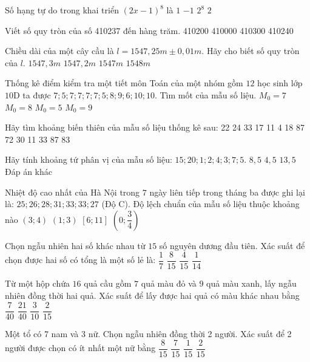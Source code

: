 \begin{ex}
Số hạng tự do trong khai triển ${{(2x-1)}^8}$ là
\choice
{$1$}
{$-1$}
{$2^8$}
{$2$}
\end{ex}
\begin{ex}
Viết số quy tròn của số 410237 đến hàng trăm.
\choice
{410200}
{410000}
{410300}
{410240}
\end{ex}
\begin{ex}
Chiều dài của một cây cầu là $l=1547{,}25m\pm 0{,}01m$. Hãy cho biết số quy tròn của $l$.
\choice
{$1547{,}3m$}
{$1547{,}2m$}
{$1547m$}
{$1548m$}
\end{ex}
\begin{ex}
Thống kê điểm kiểm tra một tiết môn Toán của một nhóm gồm $12$ học sinh lớp $10\text{D}$ ta được $7;5;7;7;7;7;5;8;9;6;10;10$. Tìm mốt của mẫu số liệu.
\choice
{$M_0=7$}
{$M_0=8$}
{$M_0=5$}
{$M_0=9$}
\end{ex}
\begin{ex}
Hãy tìm khoảng biến thiên của mẫu số liệu thống kê sau: 22 24 33 17 11 4 18 87 72 30
\choice
{11}
{33}
{87}
{83}
\end{ex}
\begin{ex}
Hãy tính khoảng tứ phân vị của mẫu số liệu: $15;20;1;2;4;3;7;5$.
\choice
{$8{,}5$}
{$4{,}5$}
{$13{,}5$}
{Đáp án khác}
\end{ex}
\begin{ex}
Nhiệt độ cao nhất của Hà Nội trong $7$ ngày liên tiếp trong tháng ba được ghi lại là: $25;26;28;31;33;33;27$ (Độ C). Độ lệch chuẩn của mẫu số liệu thuộc khoảng nào
\choice
{$\left(3;4\right)$}
{$\left(1;3\right)$}
{$\left[6;11\right]$}
{$\left(0;\dfrac{3}{4}\right)$}
\end{ex}
\begin{ex}
Chọn ngẫu nhiên hai số khác nhau từ $15$ số nguyên dương đầu tiên. Xác suất để chọn được hai số có tổng là một số lẻ là:
\choice
{$\dfrac{1}{7}$}
{$\dfrac{8}{15}$}
{$\dfrac{4}{15}$}
{$\dfrac{1}{14}$}
\end{ex}
\begin{ex}
Từ một hộp chứa $16$ quả cầu gồm $7$ quả màu đỏ và $9$ quả màu xanh, lấy ngẫu nhiên đồng thời hai quả. Xác suất để lấy được hai quả có màu khác nhau bằng
\choice
{$\dfrac{7}{40}$}
{$\dfrac{21}{40}$}
{$\dfrac{3}{10}$}
{$\dfrac{2}{15}$}
\end{ex}
\begin{ex}
Một tổ có 7 nam và 3 nữ. Chọn ngẫu nhiên đồng thời 2 người. Xác suất để 2 người được chọn có ít nhất một nữ bằng
\choice
{$\dfrac{8}{15}$}
{$\dfrac{7}{15}$}
{$\dfrac{1}{15}$}
{$\dfrac{2}{15}$}
\end{ex}
